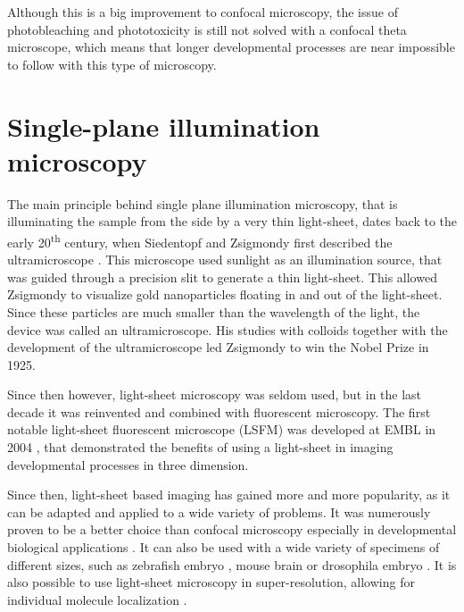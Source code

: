 \documentclass{diploma_style}
\begin{document}
Although this is a big improvement to confocal microscopy, the issue of photobleaching and phototoxicity is still not solved with a confocal theta microscope, which means that longer developmental processes are near impossible to follow with this type of microscopy.




\chapter{Single-plane illumination microscopy}
\label{chap2}

The main principle behind single plane illumination microscopy, that is illuminating the sample from the side by a very thin light-sheet, dates back to the early 20\textsuperscript{th} century, when Siedentopf and Zsigmondy first described the ultramicroscope \cite{siedentopf_uber_1902}. This microscope used sunlight as an illumination source, that was guided through a precision slit to generate a thin light-sheet. This allowed Zsigmondy to visualize gold nanoparticles floating in and out of the light-sheet. Since these particles are much smaller than the wavelength of the light, the device was called an ultramicroscope. His studies with colloids together with the development of the ultramicroscope led Zsigmondy to win the Nobel Prize in 1925.

Since then however, light-sheet microscopy was seldom used, but in the last decade it was reinvented and combined with fluorescent microscopy. The first notable light-sheet fluorescent microscope (LSFM) was developed at EMBL in 2004 \cite{huisken_optical_2004}, that demonstrated the benefits of using a light-sheet in imaging developmental processes in three dimension.

Since then, light-sheet based imaging has gained more and more popularity, as it can be adapted and applied to a wide variety of problems. It was numerously proven to be a better choice than confocal microscopy \cite{reynaud_light_2008,huisken_selective_2009} especially in developmental biological applications \cite{weber_light_2011}. It can also be used with a wide variety of specimens of different sizes, such as zebrafish embryo \cite{keller_reconstruction_2008}, mouse brain \cite{dodt_ultramicroscopy:_2007} or drosophila embryo \cite{krzic_multiview_2012}. It is also possible to use light-sheet microscopy in super-resolution, allowing for individual molecule localization \cite{zanacchi_live-cell_2011}.
	
\end{document}
